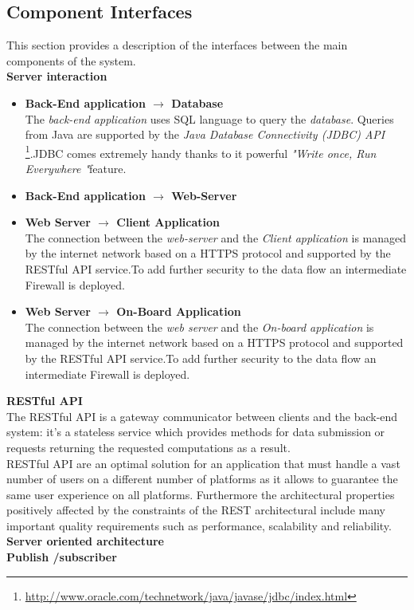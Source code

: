 \subsection{Component Interfaces}
\label{sec:CInter}
This section provides a description of the interfaces between the main components
of the system.
\\[0.2in]
\textbf{Server interaction}\\
\begin{itemize}
\item \textbf{Back-End application $\rightarrow$ Database}\\
The \emph{back-end application} uses SQL language to query the \emph{database}. Queries from Java 
are supported by the \emph{Java Database Connectivity (JDBC) API} \footnote{\url{http://www.oracle.com/technetwork/java/javase/jdbc/index.html}}.JDBC comes extremely handy thanks to it powerful \emph{"Write once, Run Everywhere "}feature.
\item \textbf{Back-End application $\rightarrow$ Web-Server}\\

\item \textbf{Web Server $\rightarrow$ Client Application}\\
The connection between the \emph{web-server} and the \emph{Client application} is managed by the internet network based on a HTTPS protocol and supported by the RESTful API service.To add further security to the data flow an intermediate Firewall is deployed.
\item \textbf{Web Server $\rightarrow$ On-Board Application}\\
The connection between the \emph{web server} and the \emph{On-board application} is managed by the internet network based on a HTTPS protocol and supported by the RESTful API service.To add further security to the data flow an intermediate Firewall is deployed.
\end{itemize}
\textbf{RESTful API}\\The RESTful API is a gateway communicator between clients and the back-end system: it's a stateless service which provides methods for data submission or requests returning the requested computations as a result.\\
RESTful API are an optimal solution for an application that must handle a vast number of users on a different number of platforms as it allows to guarantee the same user experience on all platforms. Furthermore the architectural properties positively affected by the constraints of the REST architectural include many important quality requirements such as performance, scalability and reliability.\\[0.2in]
\textbf{Server oriented architecture}
\\[0.2in]
\textbf{Publish /subscriber}
\\[0.2in]


